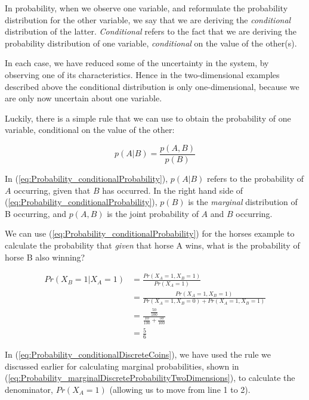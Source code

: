 \documentclass[11pt,fullpage]{book}
\begin{document}
In probability, when we observe one variable, and reformulate the probability distribution for the other variable, we say that we are deriving the \textit{conditional} distribution of the latter. \textit{Conditional} refers to the fact that we are deriving the probability distribution of one variable, \textit{conditional} on the value of the other(s).

In each case, we have reduced some of the uncertainty in the system, by observing one of its characteristics. Hence in the two-dimensional examples described above the conditional distribution is only one-dimensional, because we are only now uncertain about one variable. 

Luckily, there is a simple rule that we can use to obtain the probability of one variable, conditional on the value of the other:

\begin{equation}\label{eq:Probability_conditionalProbability}
p(A|B) = \frac{p(A,B)}{p(B)}
\end{equation}

In (\ref{eq:Probability_conditionalProbability}), $p(A|B)$ refers to the probability of $A$ occurring, given that $B$ has occurred. In the right hand side of (\ref{eq:Probability_conditionalProbability}), $p(B)$ is the \textit{marginal} distribution of B occurring, and $p(A,B)$ is the joint probability of $A$ and $B$ occurring.

We can use (\ref{eq:Probability_conditionalProbability}) for the horses example to calculate the probability that \textit{given} that horse A wins, what is the probability of horse B also winning?

\begin{equation}\label{eq:Probability_conditionalDiscreteCoins}
\begin{align}
Pr(X_B=1|X_A=1) &= \frac{Pr(X_A=1,X_B=1)}{Pr(X_A=1)}\\
&= \frac{Pr(X_A=1,X_B=1)}{Pr(X_A=1,X_B=0)+Pr(X_A=1,X_B=1)}\\
&= \frac{\frac{50}{100}}{\frac{10}{100} + \frac{50}{100}}\\ 
&= \frac{5}{6}
\end{align}
\end{equation}

In (\ref{eq:Probability_conditionalDiscreteCoins}), we have used the rule we discussed earlier for calculating marginal probabilities, shown in (\ref{eq:Probability_marginalDiscreteProbabilityTwoDimensions}), to calculate the denominator, $Pr(X_A=1)$ (allowing us to move from line 1 to 2).
\end{document}
